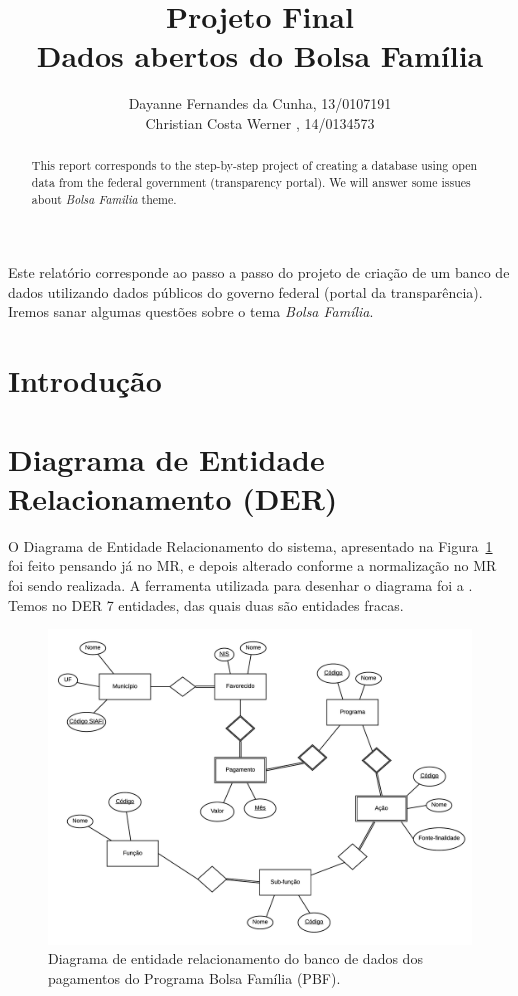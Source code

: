 \documentclass[12pt]{article}
\title{Projeto Final\\ 
	Dados abertos do Bolsa Família}
\author{Dayanne Fernandes da Cunha, 13/0107191\\
	 Christian Costa Werner ,  14/0134573
}
\begin{document}
 
	\maketitle
	
	\begin{abstract}
		This report corresponds to the step-by-step project of creating a database using open data from the federal government (transparency portal). We will answer some issues about \textit{Bolsa Familia} theme.
	\end{abstract}
	
	\begin{resumo} 
		Este relatório corresponde ao passo a passo do projeto de criação de um banco de dados utilizando dados públicos do governo federal (portal da transparência). Iremos sanar algumas questões sobre o tema \textit{Bolsa Família}.
	\end{resumo}
	
	\tableofcontents
	\newpage 
	
	\section{Introdução}
	\label{sec:intro}
	
	\section{Diagrama de Entidade Relacionamento (DER)}
	\label{sec:der}
	
	O Diagrama de Entidade Relacionamento do sistema, apresentado na Figura~\ref{fig:der} foi feito pensando já no MR, e depois alterado conforme a normalização no MR foi sendo realizada. A ferramenta utilizada para desenhar o diagrama foi a \cite{lucid}. Temos no DER 7 entidades, das quais duas são entidades fracas. 
	
	\begin{figure}[H]
		\centering
		\includegraphics[width=1\textwidth]{der.png}
		\caption{Diagrama de entidade relacionamento do banco de dados dos pagamentos do Programa Bolsa Família (PBF).}
		\label{fig:der}
	\end{figure}
	
\end{document}
